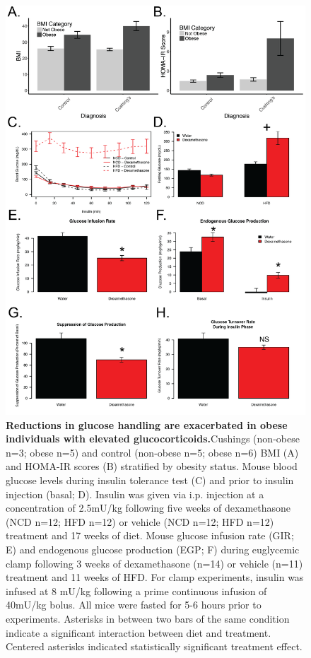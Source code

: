 \documentclass[11pt]{article} %
\begin{document}
\begin{figure}
  \begin{center}
    \includegraphics[width=\textwidth]{Figures_Figure_1.png}
  \end{center}
  \caption{\textbf{Reductions in glucose handling are exacerbated in obese individuals with elevated glucocorticoids.}Cushings (non-obese n=3; obese n=5) and control (non-obese n=5; obese n=6) BMI (A) and HOMA-IR scores (B) stratified by obesity status. Mouse blood glucose levels during insulin tolerance test (C) and prior to insulin injection (basal; D). Insulin was given via i.p. injection at a concentration of 2.5mU/kg following five weeks of dexamethasone (NCD n=12; HFD n=12) or vehicle (NCD n=12; HFD n=12) treatment and 17 weeks of diet. Mouse glucose infusion rate (GIR; E) and endogenous glucose production (EGP; F) during euglycemic clamp following 3 weeks of dexamethasone (n=14) or vehicle (n=11) treatment and 11 weeks of HFD. For clamp experiments, insulin was infused at 8 mU/kg following a prime continuous infusion of 40mU/kg bolus. All mice were fasted for 5-6 hours prior to experiments. Asterisks in between two bars of the same condition indicate a significant interaction between diet and treatment. Centered asterisks indicated statistically significant treatment effect.}
 \label{fig:1}
\end{figure}
\end{document}
